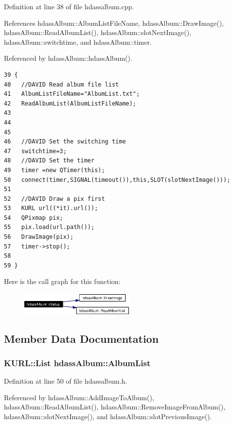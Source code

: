 Definition at line 38 of file hdassalbum.cpp.

References hdass\-Album::Album\-List\-File\-Name, hdass\-Album::Draw\-Image(), hdass\-Album::Read\-Album\-List(), hdass\-Album::slot\-Next\-Image(), hdass\-Album::switchtime, and hdass\-Album::timer.

Referenced by hdass\-Album::hdass\-Album().



\footnotesize\begin{verbatim}39 {
40   //DAVID Read album file list 
41   AlbumListFileName="AlbumList.txt";
42   ReadAlbumList(AlbumListFileName);
43   
44  
45 
46   //DAVID Set the switching time
47   switchtime=3;
48   //DAVID Set the timer
49   timer =new QTimer(this);
50   connect(timer,SIGNAL(timeout()),this,SLOT(slotNextImage()));
51   
52   //DAVID Draw a pix first
53   KURL url((*it).url());
54   QPixmap pix;
55   pix.load(url.path());
56   DrawImage(pix);
57   timer->stop();
58   
59 }
\end{verbatim}\normalsize 


Here is the call graph for this function:\begin{figure}[H]
\begin{center}
\leavevmode
\includegraphics[width=164pt]{classhdassAlbum_ImageDetiala2_cgraph}
\end{center}
\end{figure}


\subsection{Member Data Documentation}
\subsubsection{\setlength{\rightskip}{0pt plus 5cm}KURL::List {\bf hdass\-Album::Album\-List}\hspace{0.3cm}{\tt  [inherited]}}\label{classhdassAlbum_ImageDetialo1}




Definition at line 50 of file hdassalbum.h.

Referenced by hdass\-Album::Add\-Image\-To\-Album(), hdass\-Album::Read\-Album\-List(), hdass\-Album::Remove\-Image\-From\-Album(), hdass\-Album::slot\-Next\-Image(), and hdass\-Album::slot\-Previous\-Image().
